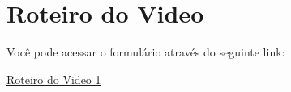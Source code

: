 \chapter{Roteiro do Video}

\label{chap:roteiro1}

Você pode acessar o formulário através do seguinte link:

\begin{center}
  \href{https://www.youtube.com/watch?v=H80poFoIqsw}
       {Roteiro do Video 1}
\end{center}

